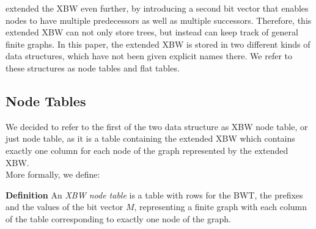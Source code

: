 \documentclass[a4paper,12pt,twoside,BCOR=10mm]{scrbook}
\begin{document}
\citet{Siren2014} extended the XBW even further, by introducing a second bit vector that enables nodes 
to have multiple predecessors as well as multiple successors. Therefore, this extended XBW can not only 
store trees, but instead can keep track of general finite graphs. 
In this paper, the extended XBW is stored in two different kinds of data structures, 
which have not been given explicit names there. We refer to these structures as 
node tables and flat tables.

\subsection{Node Tables}
\label{sec:node_table_definition}

We decided to refer to the first of the two data structure as XBW node table, or just node table, 
as it is a 
table containing the extended XBW which contains exactly one column for each 
node of the graph represented by the extended XBW. \\
More formally, we define:

\textbf{Definition} An \textit{XBW node table}\label{def:node_table} is a table with rows for the BWT, 
the prefixes and the values of the bit vector $ M $, 
representing a finite graph with each column of the table corresponding 
to exactly one node of the graph.
\end{document}

